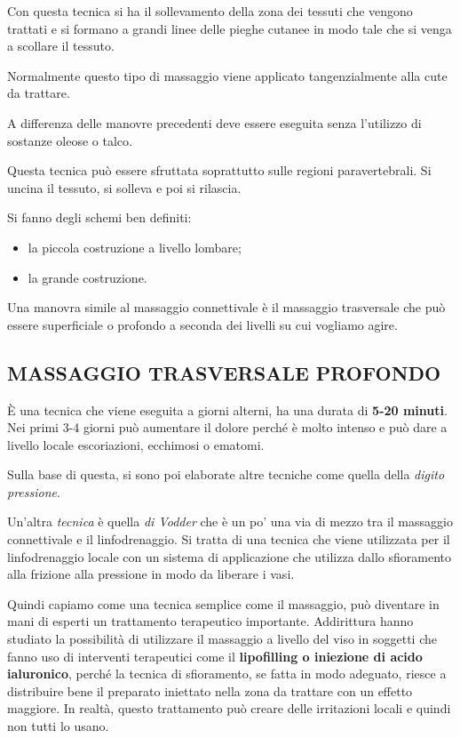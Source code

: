 Con questa tecnica si ha il sollevamento della zona dei tessuti che
vengono trattati e si formano a grandi linee delle pieghe cutanee in
modo tale che si venga a scollare il tessuto.

Normalmente questo tipo di massaggio viene applicato tangenzialmente
alla cute da trattare.

A differenza delle manovre precedenti deve essere eseguita senza
l'utilizzo di sostanze oleose o talco.

Questa tecnica può essere sfruttata soprattutto sulle regioni
paravertebrali. Si uncina il tessuto, si solleva e poi si rilascia.

Si fanno degli schemi ben definiti:

\begin{itemize}
\item
  la piccola costruzione a livello lombare;
\item
  la grande costruzione.
\end{itemize}

Una manovra simile al massaggio connettivale è il massaggio trasversale
che può essere superficiale o profondo a seconda dei livelli su cui
vogliamo agire.

\subsection{MASSAGGIO TRASVERSALE PROFONDO}


È una tecnica che viene eseguita a giorni alterni, ha una durata di
\textbf{5-20 minuti}. Nei primi 3-4 giorni può aumentare il dolore
perché è molto intenso e può dare a livello locale escoriazioni,
ecchimosi o ematomi.

Sulla base di questa, si sono poi elaborate altre tecniche come quella
della \emph{digito pressione}.

Un'altra \emph{tecnica} è quella \emph{di Vodder} che è un po' una via
di mezzo tra il massaggio connettivale e il linfodrenaggio. Si tratta di
una tecnica che viene utilizzata per il linfodrenaggio locale con un
sistema di applicazione che utilizza dallo sfioramento alla frizione
alla pressione in modo da liberare i vasi.

Quindi capiamo come una tecnica semplice come il massaggio, può
diventare in mani di esperti un trattamento terapeutico importante.
Addirittura hanno studiato la possibilità di utilizzare il massaggio a
livello del viso in soggetti che fanno uso di interventi terapeutici
come il \textbf{lipofilling o iniezione di acido ialuronico}, perché la
tecnica di sfioramento, se fatta in modo adeguato, riesce a distribuire
bene il preparato iniettato nella zona da trattare con un effetto
maggiore. In realtà, questo trattamento può creare delle irritazioni
locali e quindi non tutti lo usano.
